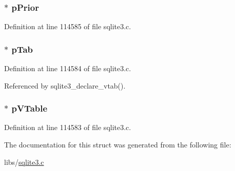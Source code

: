 \hypertarget{struct_vtab_ctx_ace2a9f53761a60c5b12887ec597e53b5}{}
\subsubsection[{p\+Prior}]{$\ast$ p\+Prior}\label{struct_vtab_ctx_ace2a9f53761a60c5b12887ec597e53b5}


Definition at line 114585 of file sqlite3.\+c.

\hypertarget{struct_vtab_ctx_a11b1abc167f386db2ab7fc634c880c26}{}
\subsubsection[{p\+Tab}]{$\ast$ p\+Tab}\label{struct_vtab_ctx_a11b1abc167f386db2ab7fc634c880c26}


Definition at line 114584 of file sqlite3.\+c.



Referenced by sqlite3\+\_\+declare\+\_\+vtab().

\hypertarget{struct_vtab_ctx_a8d76cc75cc811868888fbf6bf8b3a460}{}
\subsubsection[{p\+V\+Table}]{$\ast$ p\+V\+Table}\label{struct_vtab_ctx_a8d76cc75cc811868888fbf6bf8b3a460}


Definition at line 114583 of file sqlite3.\+c.



The documentation for this struct was generated from the following file\+:\begin{DoxyCompactItemize}
\item 
libs/\hyperlink{sqlite3_8c}{sqlite3.\+c}\end{DoxyCompactItemize}
